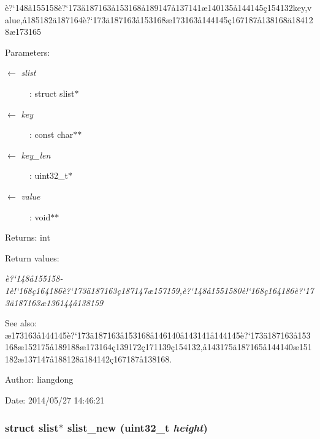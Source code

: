 \`{e}?`148\aa{}155158\`{e}?`173\"{a}187163\aa{}153168\aa{}189147\aa{}137141\ae{}140135\aa{}144145\c{c}154132key,value,\aa{}185182\"{a}187164\`{e}?`173\"{a}187163\aa{}153168\ae{}173163\aa{}144145\c{c}167187\aa{}138168\"{a}184128\ae{}173165 

\begin{Desc}
\item[Parameters:]
\begin{description}
\item[\mbox{$\leftarrow$} {\em slist}]: struct slist$\ast$ \item[\mbox{$\leftarrow$} {\em key}]: const char$\ast$$\ast$ \item[\mbox{$\leftarrow$} {\em key\_\-len}]: uint32\_\-t$\ast$ \item[\mbox{$\leftarrow$} {\em value}]: void$\ast$$\ast$ \end{description}
\end{Desc}
\begin{Desc}
\item[Returns:]int \end{Desc}
\begin{Desc}
\item[Return values:]
\begin{description}
\item[{\em \`{e}?`148\aa{}155158-1\`{e}!`168\c{c}164186\`{e}?`173\"{a}187163\c{c}187147\ae{}157159,\`{e}?`148\aa{}1551580\`{e}!`168\c{c}164186\`{e}?`173\"{a}187163\ae{}136144\aa{}138159}]\end{description}
\end{Desc}
\begin{Desc}
\item[See also:]\ae{}173163\aa{}144145\`{e}?`173\"{a}187163\aa{}153168\aa{}146140\aa{}143141\aa{}144145\`{e}?`173\"{a}187163\aa{}153168\ae{}152175\aa{}189188\ae{}173164\c{c}139172\c{c}171139\c{c}154132,\aa{}143175\"{a}187165\aa{}144140\ae{}151182\ae{}137147\aa{}188128\"{a}184142\c{c}167187\aa{}138168. \end{Desc}
\begin{Desc}
\item[Author:]liangdong \end{Desc}
\begin{Desc}
\item[Date:]2014/05/27 14:46:21 \end{Desc}
\subsubsection{\setlength{\rightskip}{0pt plus 5cm}struct slist$\ast$ slist\_\-new (uint32\_\-t {\em height})}\label{slist_8c_a2}


